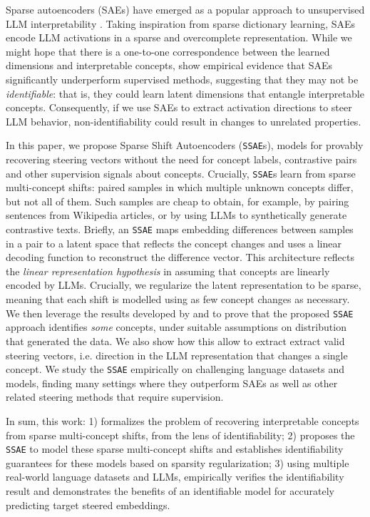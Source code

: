 \documentclass{article}
\newcommand{\isae}{\texttt{SSAE}\xspace}
\begin{document}
Sparse autoencoders (SAEs) have emerged as a popular approach to unsupervised LLM interpretability \citep{cunningham2023sparseautoencodershighlyinterpretable}. Taking inspiration from sparse dictionary learning, SAEs encode LLM activations in a sparse and overcomplete representation. While we might hope that there is a one-to-one correspondence between the learned dimensions and interpretable concepts, \citep{wu2025axbenchsteeringllmssimple, Menon2024AnalyzingO} show empirical evidence that SAEs significantly underperform supervised methods, suggesting that they may not be \emph{identifiable}: that is, they could learn latent dimensions that entangle interpretable concepts.
Consequently, if we use SAEs to extract activation directions to steer LLM behavior, non-identifiability could result in changes to unrelated properties.

In this paper, we propose Sparse Shift Autoencoders ({\isae}s), models for provably recovering steering vectors without the need for concept labels, contrastive pairs and other supervision signals about concepts. Crucially, {\isae}s learn from sparse multi-concept shifts: paired samples in which multiple unknown concepts differ, but not all of them. Such samples are cheap to obtain, for example, by pairing sentences from Wikipedia articles, or by using LLMs to synthetically generate contrastive texts.  Briefly, an \isae maps embedding differences between samples in a pair to a latent space that reflects the concept changes and uses a linear decoding function to reconstruct the difference vector. This architecture reflects the \textit{linear representation hypothesis} \citep{mikolov-etal-2013-linguistic, jiang2024originslinearrepresentationslarge} in assuming that concepts are linearly encoded by LLMs. Crucially, we regularize the latent representation to be sparse, meaning that each shift is modelled using as few concept changes as necessary.
We then leverage the results developed by \citet{lachapelle2023synergies} and \citet{xu2024sparsityprinciplepartiallyobservable} to prove that the proposed \isae approach identifies \emph{some} concepts, under suitable assumptions on distribution that generated the data. We also show how this allow to extract extract valid steering vectors, i.e. direction in the LLM representation that changes a single concept.
We study the \isae empirically on challenging language datasets and models, finding many settings where they outperform SAEs as well as other related steering methods that require supervision.

In sum, this work: 1) formalizes the problem of recovering interpretable concepts from sparse multi-concept shifts, from the lens of identifiability; 2) proposes the \isae to model these sparse multi-concept shifts and establishes identifiability guarantees for these models based on sparsity regularization; 3) using multiple real-world language datasets and LLMs, empirically verifies the identifiability result and demonstrates the benefits of an identifiable model for accurately predicting target steered embeddings.
\end{document}
